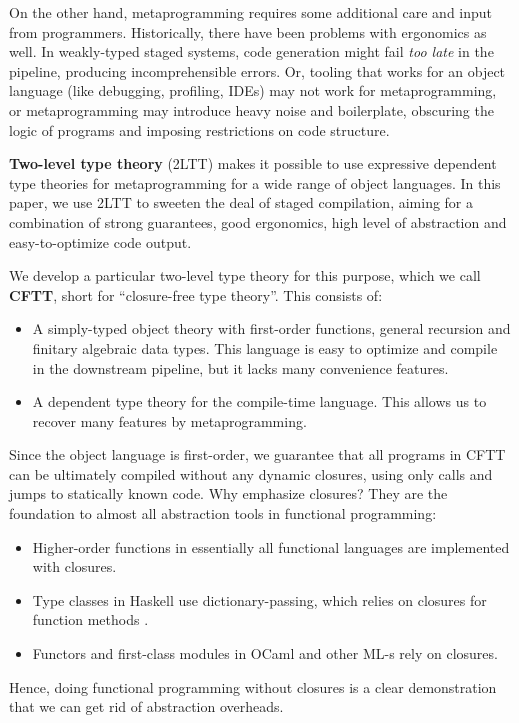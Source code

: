 \documentclass[acmsmall,screen,review,anonymous]{acmart}
\theoremstyle{remark}
\begin{document}
On the other hand, metaprogramming requires some additional care and input from
programmers. Historically, there have been problems with ergonomics as well. In
weakly-typed staged systems, code generation might fail \emph{too late} in the
pipeline, producing incomprehensible errors. Or, tooling that works for an
object language (like debugging, profiling, IDEs) may not work for metaprogramming, or
metaprogramming may introduce heavy noise and boilerplate, obscuring the logic
of programs and imposing restrictions on code structure.

\textbf{Two-level type theory} (2LTT) \cite{twolevel,staged2ltt} makes it
possible to use expressive dependent type theories for metaprogramming
for a wide range of object languages. In this paper, we use 2LTT to sweeten the
deal of staged compilation, aiming for a combination of strong guarantees, good
ergonomics, high level of abstraction and easy-to-optimize code output.

We develop a particular two-level type theory for this purpose, which we
call \textbf{CFTT}, short for ``closure-free type theory''. This consists
of:
\begin{itemize}
\item A simply-typed object theory with first-order functions, general recursion and
      finitary algebraic data types. This language is easy to optimize and compile
      in the downstream pipeline, but it lacks many convenience features.
\item A dependent type theory for the compile-time language. This
      allows us to recover many features by metaprogramming.
\end{itemize}
Since the object language is first-order, we guarantee that all programs in CFTT
can be ultimately compiled without any dynamic closures, using only calls and
jumps to statically known code. Why emphasize closures?  They are the
foundation to almost all abstraction tools in functional programming:
\begin{itemize}
\item Higher-order functions in essentially all functional languages are implemented with closures.
\item Type classes in Haskell use dictionary-passing, which relies on closures for function methods \cite{DBLP:conf/popl/WadlerB89}.
\item Functors and first-class modules in OCaml \cite{leroy2023ocaml} and other ML-s rely on closures.
\end{itemize}
Hence, doing functional programming without closures is a clear demonstration
that we can get rid of abstraction overheads.
\end{document}
